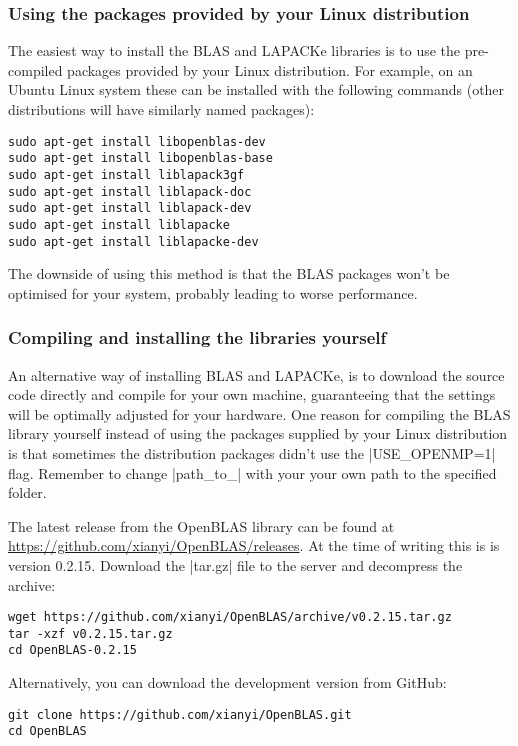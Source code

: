 \subsubsection{Using the packages provided by your Linux distribution}
The easiest way to install the \ac{BLAS} and LAPACKe libraries is to
use the pre-compiled packages provided by your Linux distribution. For
example, on an Ubuntu Linux system these can be installed with the
following commands (other distributions will have similarly named
packages):
\begin{lstlisting}[escapechar=\%]
sudo apt-get install libopenblas-dev
sudo apt-get install libopenblas-base
sudo apt-get install liblapack3gf
sudo apt-get install liblapack-doc
sudo apt-get install liblapack-dev
sudo apt-get install liblapacke
sudo apt-get install liblapacke-dev
\end{lstlisting}
The downside of using this method is that the BLAS packages won't be
optimised for your system, probably leading to worse performance.


\subsubsection{Compiling and installing the libraries yourself}
An alternative way of installing \ac{BLAS} and LAPACKe, is to download
the source code directly and compile for your own machine,
guaranteeing that the settings will be optimally adjusted for your
hardware. One reason for compiling the \ac{BLAS} library yourself
instead of using the packages supplied by your Linux distribution is
that sometimes the distribution packages didn't use the |USE_OPENMP=1|
flag. Remember to change |path_to_| with your your own path to the
specified folder.

The latest release from the OpenBLAS library can be found at
\url{https://github.com/xianyi/OpenBLAS/releases}. At the time of
writing this is is version 0.2.15. Download the |tar.gz| file to the
server and decompress the archive:
\begin{lstlisting}[basicstyle=\footnotesize\ttfamily]
wget https://github.com/xianyi/OpenBLAS/archive/v0.2.15.tar.gz
tar -xzf v0.2.15.tar.gz
cd OpenBLAS-0.2.15
\end{lstlisting}

Alternatively, you can download the development version from GitHub:
\begin{lstlisting}[escapechar=\%]
git clone https://github.com/xianyi/OpenBLAS.git
cd OpenBLAS
\end{lstlisting}

